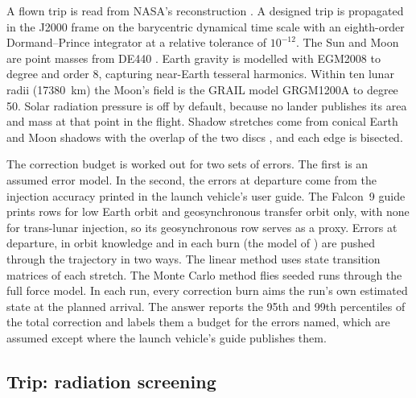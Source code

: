 \documentclass[11pt,a4paper]{article}
\begin{document}
A flown trip is read from NASA's reconstruction \citep{naifclps}. A designed trip is
propagated in the J2000 frame on the barycentric dynamical time scale with an
eighth-order Dormand--Prince integrator at a relative tolerance of $10^{-12}$. The Sun
and Moon are point masses from DE440 \citep{park2021}. Earth gravity is modelled with
EGM2008 \citep{pavlis2012} to degree and order 8, capturing near-Earth tesseral harmonics.
Within ten lunar radii (\qty{17380}{\km}) the Moon's field is the GRAIL model GRGM1200A
\citep{zuber2013} to degree 50. Solar radiation pressure is off by default, because no
lander publishes its area and mass at that point in the flight. Shadow stretches come from
conical Earth and Moon shadows with the overlap of the two discs \citep{montenbruck2000},
and each edge is bisected.

The correction budget is worked out for two sets of errors. The first is an assumed error
model. In the second, the errors at departure come from the injection accuracy printed in the
launch vehicle's user guide. The Falcon~9 guide prints rows for low Earth orbit and
geosynchronous transfer orbit only, with none for trans-lunar injection, so its geosynchronous
row serves as a proxy.
Errors at departure, in orbit knowledge and in each burn (the model of
\citet{gates1963}) are pushed through the trajectory in two ways. The linear method uses
state transition matrices of each stretch. The Monte Carlo method flies seeded runs
through the full force model. In each run, every correction burn aims the run's own
estimated state at the planned arrival. The answer reports the 95th and 99th percentiles of the
total correction and labels them a budget for the errors named, which are assumed except where
the launch vehicle's guide publishes them.

\subsection{Trip: radiation screening}
\end{document}
